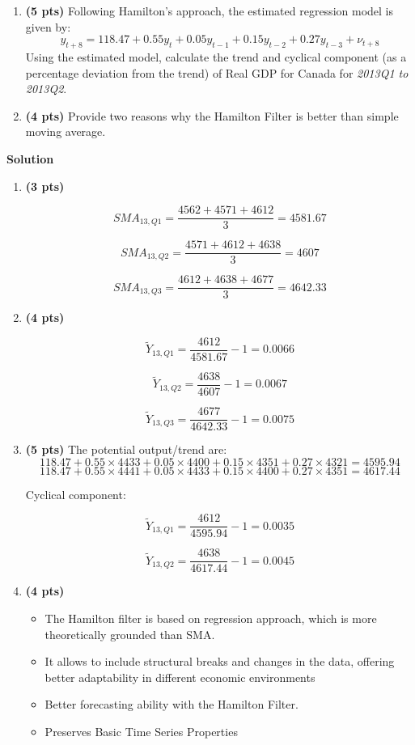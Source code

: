 \documentclass[14pt, oneside]{memoir}
\begin{document}
\begin{enumerate}[label=\textbf{\arabic*.}, itemsep=15pt]
\begin{enumerate}[label=(\alph*)]
	If applicable, keep four digits after the decimal point or two digits if the result is expressed in percentage.
	\vspace{8cm}
	\item \textbf{(5 pts)} Following Hamilton's approach, the estimated regression model is given by:
	\[
	y_{t+8} = 118.47 + 0.55 y_{t} + 0.05 y_{t-1} + 0.15 y_{t-2} + 0.27 y_{t-3} + \nu_{t+8}
	\]
	Using the estimated model, calculate the trend and cyclical component (as a percentage deviation from the trend) of Real GDP for Canada for \textit{2013Q1 to 2013Q2}.
	\clearpage
	\vspace*{10cm}
	\item \textbf{(4 pts)} Provide two reasons why the Hamilton Filter is better than simple moving average.
\end{enumerate}
\newpage

\textbf{Solution}
\begin{enumerate}[label=(\alph*)]
	\item \textbf{(3 pts)} 
	
	\[SMA_{13,Q1} = \frac{4562+4571+4612}{3} = 4581.67\]
	
	\[SMA_{13,Q2} = \frac{4571+4612+4638}{3} =  4607 \]
	
	\[SMA_{13,Q3} = \frac{4612+4638+4677}{3} =4642.33\]
	
	\item \textbf{(4 pts)} 
	
	\[\tilde{Y}_{13,Q1} = \frac{4612}{4581.67} - 1 = 0.0066	\]
	
	\[\tilde{Y}_{13,Q2} = \frac{4638}{4607} - 1 = 0.0067	\]
	
	\[\tilde{Y}_{13,Q3} = \frac{4677}{4642.33} - 1 = 0.0075	\]
	
	\item \textbf{(5 pts)}
	The potential output/trend are:
	\[
	118.47 + 0.55 \times 4433 + 0.05 \times 4400 + 0.15 \times 4351 + 0.27 \times 4321 = 4595.94
	\]
	\[
	118.47 + 0.55\times 4441 + 0.05 \times 4433 + 0.15 \times 4400 + 0.27 \times 4351 = 4617.44
	\]

	Cyclical component:
	
	\[\tilde{Y}_{13,Q1} = \frac{4612}{4595.94} - 1 = 0.0035\]
	
	\[\tilde{Y}_{13,Q2} = \frac{4638}{4617.44} - 1 = 0.0045\]
	\clearpage
	\item \textbf{(4 pts)} 
	\begin{itemize}
		\item The Hamilton filter is based on regression approach, which is more theoretically grounded than SMA.
		\item It allows to include structural breaks and changes in the data, offering better adaptability in different economic environments
		\item Better forecasting ability with the Hamilton Filter.
		\item Preserves Basic Time Series Properties
	\end{itemize}
\end{enumerate}


\end{enumerate}
\end{document}
